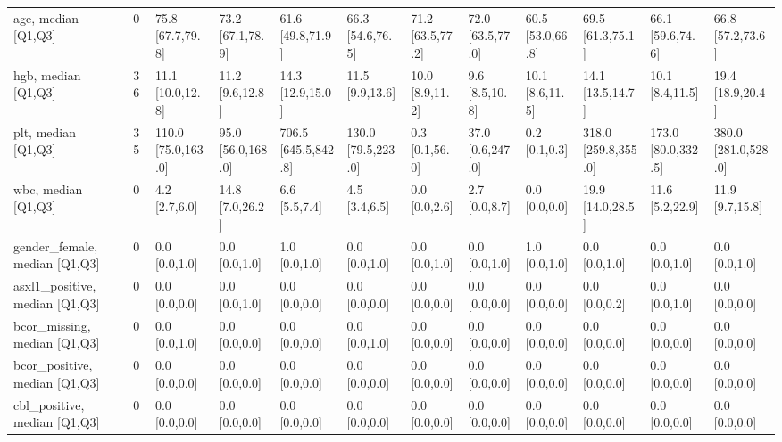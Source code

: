 \begin{tabular}{lllllllllllll}
age, median [Q1,Q3] &    &                    0 &    75.8 [67.7,79.8] &   73.2 [67.1,78.9] &     61.6 [49.8,71.9] &    66.3 [54.6,76.5] &  71.2 [63.5,77.2] &  72.0 [63.5,77.0] &  60.5 [53.0,66.8] &     69.5 [61.3,75.1] &    66.1 [59.6,74.6] &     66.8 [57.2,73.6] \\
hgb, median [Q1,Q3] &    &                   36 &    11.1 [10.0,12.8] &    11.2 [9.6,12.8] &     14.3 [12.9,15.0] &     11.5 [9.9,13.6] &   10.0 [8.9,11.2] &    9.6 [8.5,10.8] &   10.1 [8.6,11.5] &     14.1 [13.5,14.7] &     10.1 [8.4,11.5] &     19.4 [18.9,20.4] \\
plt, median [Q1,Q3] &    &                   35 &  110.0 [75.0,163.0] &  95.0 [56.0,168.0] &  706.5 [645.5,842.8] &  130.0 [79.5,223.0] &    0.3 [0.1,56.0] &  37.0 [0.6,247.0] &     0.2 [0.1,0.3] &  318.0 [259.8,355.0] &  173.0 [80.0,332.5] &  380.0 [281.0,528.0] \\
wbc, median [Q1,Q3] &    &                    0 &       4.2 [2.7,6.0] &    14.8 [7.0,26.2] &        6.6 [5.5,7.4] &       4.5 [3.4,6.5] &     0.0 [0.0,2.6] &     2.7 [0.0,8.7] &     0.0 [0.0,0.0] &     19.9 [14.0,28.5] &     11.6 [5.2,22.9] &      11.9 [9.7,15.8] \\
gender\_female, median [Q1,Q3] &    &                    0 &       0.0 [0.0,1.0] &      0.0 [0.0,1.0] &        1.0 [0.0,1.0] &       0.0 [0.0,1.0] &     0.0 [0.0,1.0] &     0.0 [0.0,1.0] &     1.0 [0.0,1.0] &        0.0 [0.0,1.0] &       0.0 [0.0,1.0] &        0.0 [0.0,1.0] \\
asxl1\_positive, median [Q1,Q3] &    &                    0 &       0.0 [0.0,0.0] &      0.0 [0.0,1.0] &        0.0 [0.0,0.0] &       0.0 [0.0,0.0] &     0.0 [0.0,0.0] &     0.0 [0.0,0.0] &     0.0 [0.0,0.0] &        0.0 [0.0,0.2] &       0.0 [0.0,1.0] &        0.0 [0.0,0.0] \\
bcor\_missing, median [Q1,Q3] &    &                    0 &       0.0 [0.0,1.0] &      0.0 [0.0,0.0] &        0.0 [0.0,0.0] &       0.0 [0.0,1.0] &     0.0 [0.0,0.0] &     0.0 [0.0,0.0] &     0.0 [0.0,0.0] &        0.0 [0.0,0.0] &       0.0 [0.0,0.0] &        0.0 [0.0,0.0] \\
bcor\_positive, median [Q1,Q3] &    &                    0 &       0.0 [0.0,0.0] &      0.0 [0.0,0.0] &        0.0 [0.0,0.0] &       0.0 [0.0,0.0] &     0.0 [0.0,0.0] &     0.0 [0.0,0.0] &     0.0 [0.0,0.0] &        0.0 [0.0,0.0] &       0.0 [0.0,0.0] &        0.0 [0.0,0.0] \\
cbl\_positive, median [Q1,Q3] &    &                    0 &       0.0 [0.0,0.0] &      0.0 [0.0,0.0] &        0.0 [0.0,0.0] &       0.0 [0.0,0.0] &     0.0 [0.0,0.0] &     0.0 [0.0,0.0] &     0.0 [0.0,0.0] &        0.0 [0.0,0.0] &       0.0 [0.0,0.0] &        0.0 [0.0,0.0] \\

\end{tabular}
